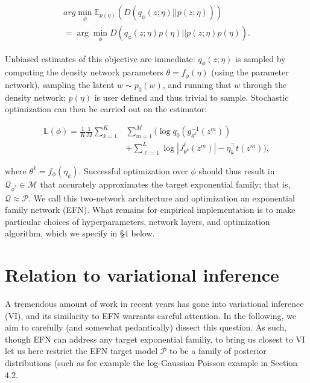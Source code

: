\documentclass[twoside]{article}
\begin{document}
{\small 
\begin{multline}
arg\!\min_{\!\!\!\!\!\!\!\!\!\!\!\phi} \mathbb{E}_{p(\eta)} \left( D\left( q_\phi(z;\eta) || p(z;\eta) \right)\right) \\ =  \arg\!\min_{\!\!\!\!\!\!\!\!\!\!\!\phi}  D\left( q_\phi(z;\eta)p(\eta) || p(z;\eta)p(\eta) \right). 
\label{eq:6}
\end{multline} }

Unbiased estimates of this objective are immediate: $q_\phi(z;\eta)$ is sampled by computing the density network parameters $\theta = f_\phi(\eta)$ (using the parameter network), sampling the latent $w \sim p_0(w)$, and running that $w$ through the density network; $p(\eta)$ is user defined and thus trivial to sample.  Stochastic optimization can then be carried out on the estimator:   


{\small 
\begin{equation}
\begin{split}
 \mathbb{L}(\phi) = \frac{1}{K}\frac{1}{M}\sum_{k=1}^K & \sum_{m=1}^M \bigg( \log q_0\left( g_{\theta^k}^{-1}\left(z^m\right)\right) \\ & + \sum_{\ell=1}^L  \log | J^\ell_{\theta^k}\left(z^m\right) | - \eta_k^\top t\left(z^m\right) \bigg),
\end{split}
\label{eq:obj}
\end{equation} }

where $\theta^k = f_\phi\left(\eta_k\right)$.  Successful optimization over $\phi$ should thus result in $\mathcal{Q}_{\phi^*} \in \mathcal{M}$ that accurately approximates the target exponential family; that is, $\mathcal{Q} \approx \mathcal{P}$.  We call this two-network architecture and optimization an exponential family network (EFN).   What remains for empirical implementation is to make particular choices of hyperparameters, network layers, and optimization algorithm, which we specify in \S4 below.

\section{Relation to variational inference}

A tremendous amount of work in recent years has gone into variational inference (VI), and its similarity to EFN warrants careful attention. 
In the following, we aim to carefully (and somewhat pedantically) dissect this question.  
As such, though EFN can address any target exponential familiy, to bring us closest to VI let us here restrict the EFN target model $\mathcal{P}$ to be a family of posterior distributions (such as for example the log-Gaussian Poisson example in Section 4.2.
\end{document}
